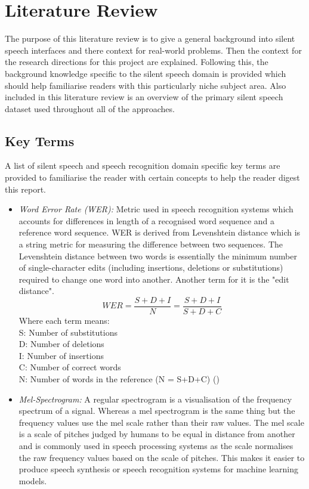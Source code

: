 \chapter{Literature Review} \label{chap:lit-review}

The purpose of this literature review is to give a general background
into silent speech interfaces and there context for real-world problems.
Then the context for the research directions for this project
are explained. Following this, the
background knowledge specific to the silent speech
domain is provided which should help familiarise readers with this particularly
niche subject area. Also included in this literature review is
an overview of the primary silent speech dataset used throughout
all of the approaches.

\section{Key Terms}

A list of silent speech and speech recognition domain specific key terms are provided
to familiarise the reader with certain concepts to help the reader digest this report.

\begin{itemize}
\item \emph{Word Error Rate (WER):}
Metric used in speech recognition systems which accounts for differences in length of
a recognised word sequence and a reference word sequence. WER is derived from
Levenshtein distance  which is a string metric for measuring the difference between two
sequences. The Levenshtein distance between two words is essentially the minimum number of
single-character edits (including insertions, deletions or substitutions) required to
change one word into another. Another term for it is the "edit distance".
\[
  WER
  = \dfrac{S + D + I}{N}
  = \dfrac{S + D + I}{S + D + C}
\]
Where each term means:\\
S: Number of substitutions\\
D: Number of deletions\\
I: Number of insertions\\
C: Number of correct words\\
N: Number of words in the reference (N = S+D+C)
(\cite{1966SPhD...10..707L})
\item \emph{Mel-Spectrogram:}
A regular spectrogram is a visualisation of the frequency spectrum
of a signal. Whereas a mel spectrogram is the same thing but the frequency
values use the mel scale rather than their raw values. The mel scale
is a scale of pitches judged by humans to be equal in distance from another
and is commonly used in speech processing systems as the scale normalises
the raw frequency values based on the scale of pitches. This makes it easier
to produce speech synthesis or speech recognition systems for machine
learning models.
\end{itemize}

